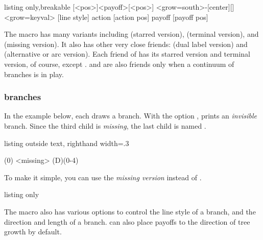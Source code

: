 \begin{tcblisting}{listing only,breakable}
  [<pos>]{<payoff>}[<pos>]
  <grow=south>{-}{}[center]{}[\istgrowdirection]
  <grow=keyval> %
  [line style] %
  {action} %
  [action pos] %
  {payoff} %
  [payoff pos] %
\end{tcblisting}

\remark The macro \cmd{\istb} has many variants including  
\cmd{\istb*} (starred version), \cmd{\istbt} (terminal version), and \cmd{\istbm} (missing version). 
It also has other very close friends: \cmd{\istB} (dual label version) and \cmd{\istbA} (alternative or arc version).
Each friend of \cmd{\istb} has its starred version and terminal version, of course, except \cmd{\istbm}.
\cmd{\cntmistb(*)} and \cmd{\cntmAistb(*)} are also friends only when a continuum of branches is in play.


\subsubsection*{branches}

In the example below, each \cmd{\istb} draws a branch.
With the option , \cmd{\istb} prints an \emph{invisible} branch.
Since the third child is \emph{missing}, the last child is named .

\begin{tcblisting}{listing outside text, righthand width=.3\linewidth}
\begin{istgame}
\istroot(0)
  \istb  \istb  \istb<missing>  \istb  \endist
\istroot(D)(0-4)
  \istb  \istb  \endist
\end{istgame}
\end{tcblisting}

To make it simple, you can use the \emph{missing version} \icmd{\istbm} instead of .
\label{page:istbm}

\begin{tcblisting}{listing only}
  \newcommand\istbm{\istb<missing>}
\end{tcblisting}

The macro \cmd{\istb} also has various options to control the line style of a branch, and the direction and length of a branch.
\cmd{\istb} can also place payoffs to the direction of tree growth by default. 

